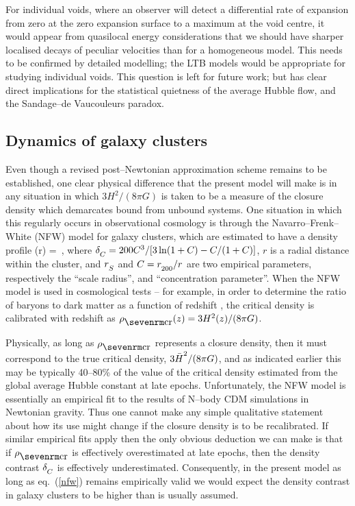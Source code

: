 \documentclass[12pt]{article}
\begin{document}
For individual voids, where an observer will detect a differential rate of
expansion from zero at the zero expansion surface to a maximum at the void
centre, it would appear from quasilocal energy considerations that we should
have sharper localised decays of peculiar velocities than for a homogeneous
model. This needs to be confirmed by detailed modelling; the LTB models would
be appropriate for studying individual voids. This question is left for future
work; but has clear direct implications for the statistical quietness of
the average Hubble flow, and the Sandage--de Vaucouleurs paradox.

\subsection{Dynamics of galaxy clusters\label{cluster}}

Even though a revised post--Newtonian approximation scheme remains to
be established, one clear physical difference that the present model
will make is in any situation in which $3H^2/(8\pi G)$ is taken to
be a measure of the closure density which demarcates bound from
unbound systems. One situation in which this regularly occurs in
observational cosmology is through the Navarro--Frenk--White (NFW) model
\cite{NFW} for galaxy clusters, which are estimated to have a density profile
\beq
\rh(r) = \,,\label{nfw}
\eeq
where
$\de\Z C = 200C^3/[3\ln(1+C) -C /(1+C)]$,
$r$ is a radial distance within the cluster, and $r\Z S$ and $C = r\Z{200}/r$
are two empirical parameters, respectively the ``scale radius'',
and ``concentration parameter''. When the NFW model is used
in cosmological tests -- for example, in order to determine the ratio of
baryons to dark matter as a function of redshift \cite{Allen}, the critical
density is calibrated with redshift as $\rhcr(z)=3H^2(z)/(8\pi G)$.

Physically, as long as $\rhcr$ represents a closure density, then
it must correspond to the true critical density, $3\bH^2/(8\pi G)$, and
as indicated earlier this may be typically 40--80\% of the value of
the critical density estimated from the global average Hubble constant
at late epochs.
Unfortunately, the NFW model is essentially an empirical fit to the
results of N--body CDM simulations in Newtonian gravity. Thus one cannot
make any simple qualitative statement about how its use might change
if the closure density is to be recalibrated. If similar empirical
fits apply then the only obvious deduction we can make is
that if $\rhcr$ is effectively overestimated at late epochs, then the
density contrast $\de\Z C$ is effectively underestimated.
Consequently, in the present model as long as eq.\ (\ref{nfw}) remains
empirically valid we would expect the density contrast in galaxy
clusters to be higher than is usually assumed.
\end{document}
